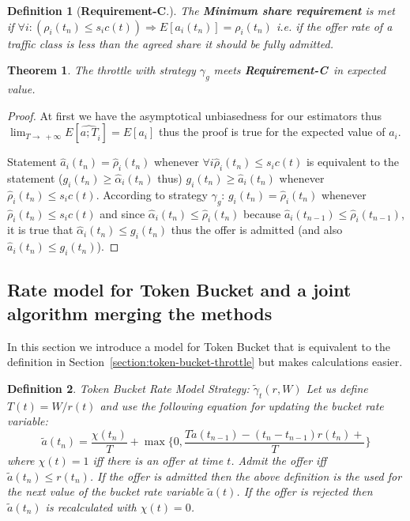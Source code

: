 \documentclass[conference]{IEEEtran}
\newtheorem{theorem}{Theorem}
\newtheorem{definition}{Definition}
\newcommand{\limT}{\lim_{T\rightarrow~+\infty}}
\newcommand{\reqC}{\textbf{Requirement-C}}
\begin{document}
\begin{definition}[\reqC.] The \textbf{Minimum share
requirement} is met if $\forall i:(\rho_i(t_n)\leq
s_ic(t))\Rightarrow E[a_i(t_n)]=\rho_i(t_n)$ i.e. if the offer rate
of a traffic class is less than the agreed share it should be fully
admitted.
\end{definition}

\begin{theorem}
The throttle with strategy $\gamma_g$ meets \reqC\ in expected
value.
\end{theorem}

\begin{proof} At first we have the asymptotical unbiasedness for our estimators thus
$\limT E[\hat{a;T}_i]=E[a_i]$ thus the proof is true for the
expected value of $a_i$.

Statement $\hat{a}_i(t_n)=\hat{\rho}_i(t_n)$ whenever $\forall i
\hat{\rho}_i(t_n)\leq s_ic(t)$ is equivalent to the statement
($g_i(t_n)\geq \hat{\alpha}_i(t_n)$ thus) $g_i(t_n)\geq
\hat{a}_i(t_n)$ whenever $\hat{\rho}_i(t_n)\leq s_ic(t)$. According
to strategy $\gamma_g$: $g_i(t_n)=\hat{\rho}_i(t_n)$ whenever
$\hat{\rho}_i(t_n)\leq s_ic(t)$ and since
$\hat{\alpha}_i(t_n)\leq\hat{\rho}_i(t_n)$ because
$\hat{a}_i(t_{n-1})\leq\hat{\rho}_i(t_{n-1})$, it is true that
$\hat{\alpha}_i(t_n)\leq g_i(t_n)$ thus the offer is admitted (and
also $\hat{a}_i(t_n)\leq g_i(t_n)$).\end{proof}

\subsection{Rate model for Token Bucket and a joint algorithm merging the
methods}\label{section:token-bucket-rate-model-class-handling} In
this section we introduce a model for Token Bucket that is
equivalent to the definition in
Section~\ref{section:token-bucket-throttle} but makes calculations
easier.

\begin{definition}
Token Bucket Rate Model Strategy: $\tilde{\gamma}_t(r,W)$ Let us
define $T(t)=W/r(t)$ and use the following equation for updating the
bucket rate variable:
\begin{equation}\nonumber
\tilde{a}(t_n)=\frac{\chi(t_n)}{T}+\max\{0,\frac{T
\tilde{a}(t_{n-1})-(t_n-t_{n-1})r(t_n)+}{T}\}
\end{equation} where $\chi(t)=1$ iff there is an offer at time $t$. Admit the offer iff
$\tilde{a}(t_n)\leq r(t_n)$. If the offer is admitted then the above
definition is the used for the next value of the bucket rate
variable $\tilde{a}(t)$. If the offer is rejected then
$\tilde{a}(t_n)$ is recalculated with $\chi(t)=0$.
\end{definition}
\end{document}
